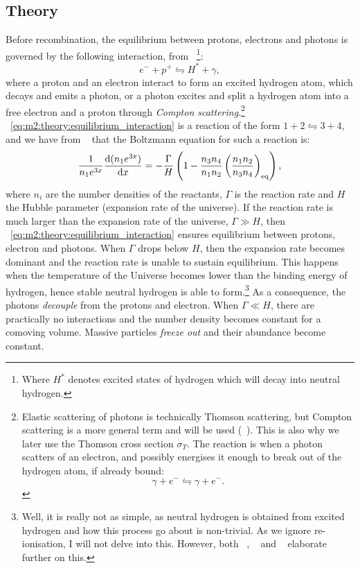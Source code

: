 \subsection{Theory}\label{sec:m2:theory}
    Before recombination, the equilibrium between protons, electrons and photons is governed by the following interaction, from ~\cite{weinberg2008cosmology}\footnote{Where $H^*$ denotes excited states of hydrogen which will decay into neutral hydrogen.}:
    \begin{equation}\label{eq:m2:theory:equilibrium_interaction}
        e^-+p^+\leftrightharpoons H^* + \gamma,
    \end{equation}
    where a proton and an electron interact to form an excited hydrogen atom, which decays and emits a photon, or a photon excites and split a hydrogen atom into a free electron and a proton through \textit{Compton scattering}.\footnote{Elastic scattering of photons is technically Thomson scattering, but Compton scattering is a more general term and will be used (~\cite{dodelson2020modern}). This is also why we later use the Thomson cross section $\sigma_T$. The reaction is when a photon scatters of an electron, and possibly energises it enough to break out of the hydrogen atom, if already bound: $$\gamma + e^- \leftrightharpoons \gamma+e^-.$$} ~\cref{eq:m2:theory:equilibrium_interaction} is a reaction of the form $1+2\leftrightharpoons 3+4$, and we have from ~\cite{AST5220LectureNotes} that the Boltzmann equation for such a reaction is:
    \begin{equation}\label{eq:m2:theory:boltzmann_eq}
        \frac{1}{n_1e^{3x}}\dv{(n_1e^{3x})}{x} = -\frac{\Gamma}{H}\left(1-\frac{n_3n_4}{n_1n_2}\left(\frac{n_1n_2}{n_3n_4}\right)_\mathrm{eq}\right),
    \end{equation}
    where $n_i$ are the number densities of the reactants, $\Gamma$ is the reaction rate and $H$ the Hubble parameter (expansion rate of the universe). If the reaction rate is much larger than the expansion rate of the universe, $\Gamma \gg H$, then ~\cref{eq:m2:theory:equilibrium_interaction} ensures equilibrium between protons, electron and photons. When $\Gamma$ drops below $H$, then the expansion rate becomes dominant and the reaction rate is unable to sustain equilibrium. This happens when the temperature of the Universe becomes lower than the binding energy of hydrogen, hence stable neutral hydrogen is able to form.\footnote{Well, it is really not as simple, as neutral hydrogen is obtained from excited hydrogen and how this process go about is non-trivial. As we ignore re-ionisation, I will not delve into this. However, both ~\cite[p. 113-129]{weinberg2008cosmology}, ~\cite[p. 95-99]{dodelson2020modern} and ~\cite{AST5220LectureNotes} elaborate further on this.} As a consequence, the photons \textit{decouple} from the protons and electron. When $\Gamma \ll H$, there are practically no interactions and the number density becomes constant for a comoving volume. Massive particles \textit{freeze out} and their abundance become constant. 

